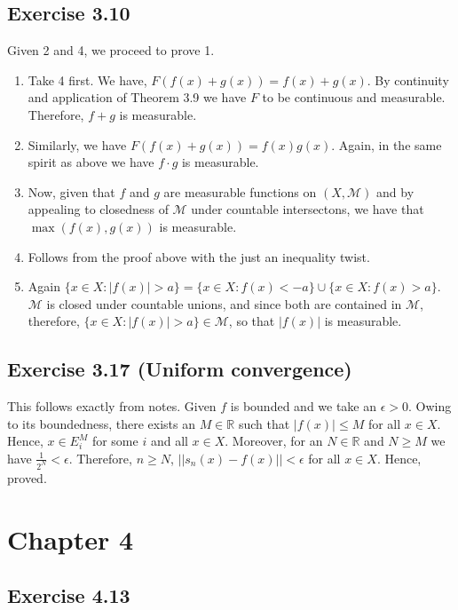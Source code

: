 \documentclass[12pt]{article}
\begin{document}
\subsection{Exercise 3.10}

Given 2 and 4, we proceed to prove 1.
\begin{enumerate}
	\item Take 4 first. We have, $F(f(x) + g(x)) = f(x) + g(x)$. By continuity and application of Theorem 3.9 we have $F$ to be continuous and measurable. Therefore, $f + g$ is measurable.
	
	\item Similarly, we have $F(f(x) + g(x)) = f(x)g(x)$. Again, in the same spirit as above we have $f \cdot g$ is measurable.
	
	\item  Now, given that  $f$ and $g$ are measurable functions on $(X,\mathcal{M})$ and by appealing to closedness of $\mathcal{M}$ under countable intersectons, we have that $\max(f(x), g(x))$ is measurable.
	\item Follows from the proof above with the just an inequality twist.
	\item Again $\{x \in X : |f(x)| > a \} = \{x \in X : f(x) < -a \} \cup \{x \in X : f(x) > a \}$. $\mathcal{M}$ is closed under countable unions, and since both are contained in $\mathcal{M}$, therefore, $\{x \in X : |f(x)| > a \} \in \mathcal{M}$, so that $|f(x)|$ is measurable.
\end{enumerate}

\subsection{Exercise 3.17 (Uniform convergence)}

	This follows exactly from notes.
	Given $f$ is  bounded and we take an $\epsilon > 0$. Owing to its boundedness, there exists an $M \in \mathbb{R}$ such that $|f(x)| \leq M$ for all $x \in X$. Hence, $x \in E^M_i$ for some $i$ and all $x \in X$. Moreover, for an $N \in \mathbb{R}$ and $N \geq M$ we have $\frac{1}{2^N} < \epsilon$. Therefore, $n \geq N$, $|| s_n(x) - f(x) || < \epsilon$ for all $x \in X$. Hence, proved.


\section{Chapter 4}

\subsection{Exercise 4.13}
\end{document}

